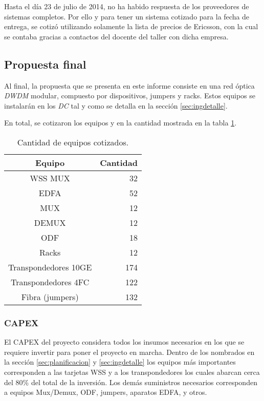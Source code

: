 
Hasta el día 23 de julio de 2014, no ha habido respuesta de los
proveedores de sistemas completos. Por ello y para tener un sistema
cotizado para la fecha de entrega, se cotizó utilizando solamente la
lista de precios de Ericsson, con la cual se contaba gracias a
contactos del docente del taller con dicha empresa.

\subsection{Propuesta final}
\label{sec:ppfinal}

Al final, la propuesta que se presenta en este informe consiste en una
red óptica \emph{DWDM} modular, compuesto por dispositivos, jumpers y
racks. Estos equipos se instalarán en los \emph{DC} tal y como se
detalla en la sección \ref{sec:ingdetalle}.

En total, se cotizaron los equipos y en la cantidad mostrada en la
tabla \ref{tab:propfinal}.

\begin{table}[H]
  \centering
  \begin{tabular}{| c | r |}
    \hline
    Equipo & Cantidad \\
    \hline
    WSS MUX & 32 \\
    EDFA & 52 \\
    MUX & 12 \\
    DEMUX & 12 \\
    ODF & 18 \\
    Racks & 12 \\
    Transpondedores 10GE & 174 \\
    Transpondedores 4FC & 122 \\
    Fibra (jumpers) & 132 \\
    \hline
  \end{tabular}
  \caption{Cantidad de equipos cotizados.}
  \label{tab:propfinal}
\end{table}

\subsubsection{CAPEX}
\label{sec:capex}

El CAPEX del proyecto considera todos los insumos necesarios en los que se requiere invertir para poner el proyecto en marcha. Dentro de los nombrados en la sección \ref{sec:planificacion} y \ref{sec:ingdetalle} los equipos más importantes corresponden a las tarjetas WSS y a los transpondedores los cuales abarcan cerca del 80\% del total de la inversión. Los demás suministros necesarios corresponden a equipos Mux/Demux, ODF, jumpers, aparatos EDFA, y otros.

